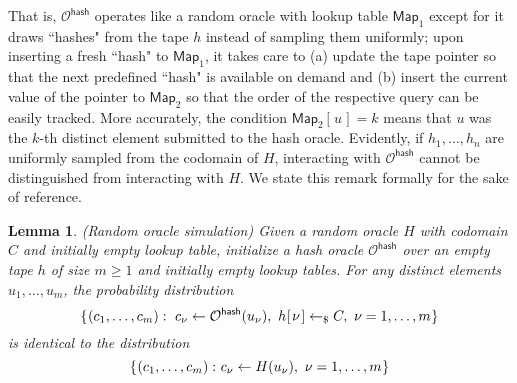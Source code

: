 \documentclass[psamsfonts, reqno]{amsart}
\newtheorem{lem}[thm]{Lemma}
\theoremstyle{definition}
\theoremstyle{remark}
\numberwithin{equation}{section}
\begin{document}
\noindent
That is, $\mathcal{O}^{\mathsf{hash}}$
operates like a random oracle with lookup table $\mathsf{Map}_1$
except for it draws ``hashes"
from the tape $h$ instead of sampling them uniformly;
upon inserting a fresh ``hash" to $\mathsf{Map}_1$,
it takes care to
(a) update the tape pointer so that
the next predefined ``hash" is available on demand and
(b) insert the current value of the pointer to $\mathsf{Map}_2$
so that the order of the respective query can be easily tracked.
More accurately, the condition
$\mathsf{Map}_2[\hspace{1pt}u\hspace{1pt}] = k$
means that $u$ was the $k$-th distinct element
submitted to the hash oracle.
Evidently, if $h_1, \dots, h_n$
are uniformly sampled from the codomain of $H$,
interacting with $\mathcal{O}^{\mathsf{hash}}$
cannot be distinguished from interacting with $H$.
We state this remark formally for the sake of reference.

\begin{lem}
\textup{(\textit{Random oracle simulation})}
Given a random oracle $H$ with codomain $C$
and initially empty lookup table,
initialize a hash oracle $\mathcal{O}^{\mathsf{hash}}$
over an empty tape $h$ of size $m \ge 1$
and initially empty lookup tables.\hspace{-0pt}
For any distinct elements $u_1, \dots, u_m$,
the probability distribution
\vspace{5pt}
\begin{equation*}
\vspace{5pt}
\{\hspace{0.5pt}(c_1, \dots, c_m):
\ c_\nu \leftarrow \mathcal{O}^{\mathsf{hash}}(u_\nu),
\ h\hspace{0.5pt}
	[
		\hspace{1pt}
		\nu
		\hspace{1pt}
	]
	\leftarrow_\$
	C,
\ \nu = 1, \dots, m\hspace{0.5pt}\}
\end{equation*}
is identical to the distribution
\vspace{5pt}
\begin{equation*}
\{\hspace{0.5pt}(c_1, \dots, c_m):\hspace{0.50pt}
c_\nu \leftarrow H(u_\nu),
\ \nu = 1, \dots, m\hspace{0.5pt}\}
\vspace{5pt}
\end{equation*}
\end{lem}
\end{document}
